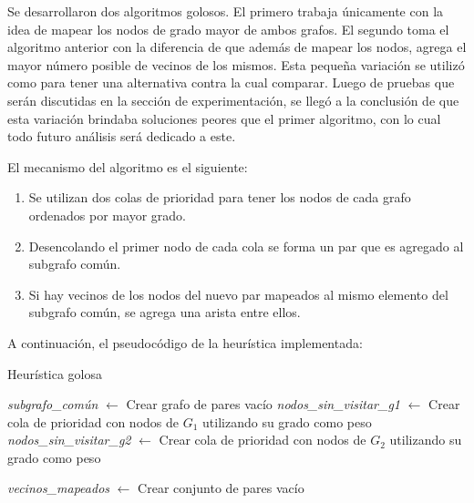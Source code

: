 Se desarrollaron dos algoritmos golosos. El primero trabaja únicamente con la idea de mapear
los nodos de grado mayor de ambos grafos. El segundo toma el algoritmo anterior con
la diferencia de que además de mapear los nodos, agrega el mayor número posible de
vecinos de los mismos. Esta pequeña variación se utilizó como para tener una
alternativa contra la cual comparar. Luego de pruebas que serán discutidas en la
sección de experimentación, se llegó a la conclusión de que esta variación
brindaba soluciones peores que el primer algoritmo, con lo cual todo futuro
análisis será dedicado a este.

El mecanismo del algoritmo es el siguiente:
\begin{enumerate}
	\item Se utilizan dos colas de prioridad para tener los nodos de cada grafo
	ordenados por mayor grado.
	\item Desencolando el primer nodo de cada cola se forma un par que es agregado al subgrafo común.
	\item Si hay vecinos de los nodos del nuevo par mapeados al mismo elemento del
	subgrafo común, se agrega una arista entre ellos.
\end{enumerate}

A continuación, el pseudocódigo de la heurística implementada:

\begin{algorithm}[H]
	\SetAlgoVlined
	\caption{Heurística golosa}
	\textit{subgrafo\_común} $\gets$ Crear grafo de pares vacío \;
	\textit{nodos\_sin\_visitar\_g1} $\gets$ Crear cola de prioridad con nodos de $G_1$ utilizando
	su grado como peso \;
	\textit{nodos\_sin\_visitar\_g2} $\gets$ Crear cola de prioridad con nodos de $G_2$ utilizando
	su grado como peso \;

	\textit{vecinos\_mapeados} $\gets$ Crear conjunto de pares vacío \;
\end{algorithm}

